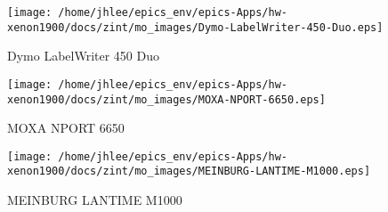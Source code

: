 \noindent
\vspace{1.4cm}
\begin{minipage}{.2\textwidth}
\begin{center}
\texttt{[image: /home/jhlee/epics\_env/epics-Apps/hw-xenon1900/docs/zint/mo\_images/Dymo-LabelWriter-450-Duo.eps]}
\end{center}
\end{minipage}
\begin{minipage}{.7\textwidth}
Dymo LabelWriter 450 Duo
\end{minipage}


\noindent
\vspace{1.4cm}
\begin{minipage}{.2\textwidth}
\begin{center}
\texttt{[image: /home/jhlee/epics\_env/epics-Apps/hw-xenon1900/docs/zint/mo\_images/MOXA-NPORT-6650.eps]}
\end{center}
\end{minipage}
\begin{minipage}{.7\textwidth}
MOXA NPORT 6650
\end{minipage}


\noindent
\vspace{1.4cm}
\begin{minipage}{.2\textwidth}
\begin{center}
\texttt{[image: /home/jhlee/epics\_env/epics-Apps/hw-xenon1900/docs/zint/mo\_images/MEINBURG-LANTIME-M1000.eps]}
\end{center}
\end{minipage}
\begin{minipage}{.7\textwidth}
MEINBURG LANTIME M1000
\end{minipage}


